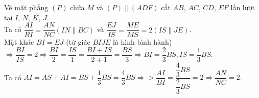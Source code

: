 \begin{ex}
{\begin{itemchoice}
\begin{center}
			\end{center}
			Vẽ mặt phẳng $(P)$ chứa $M$ và $(P)\parallel\left(ADF\right)$ cắt $AB$, $AC$,  $CD$, $EF$ lần lượt tại $I$, $N$, $K$, $J$.\\
			Ta  có $\dfrac{AI}{BI}=\dfrac{AN}{NC}\left(IN\parallel BC\right)$ và $\dfrac{EJ}{IS}=\dfrac{ME}{MS}=2\left(IS\parallel JE\right)$.\\
			Mặt khác $BI=EJ$ (tứ  giác $BIJE$ là hình bình hành)\\
			$\Rightarrow\dfrac{BI}{IS}=2\Rightarrow\dfrac{BI}{2}=\dfrac{IS}{1}=\dfrac{BI+IS}{2+1}=\dfrac{BS}{3}\Rightarrow BI=\dfrac{2}{3}BS;IS=\dfrac{1}{3}BS$.\\ 
			 Ta có $AI=AS+AI=BS+\dfrac{1}{3}BS=\dfrac{4}{3}BS\Rightarrow >\dfrac{AI}{BI}=\dfrac{\dfrac{4}{3}BS}{\dfrac{2}{3}BS}=2\Rightarrow\dfrac{AN}{NC}=2$.
		\end{itemchoice}
	} 
\end{ex}

